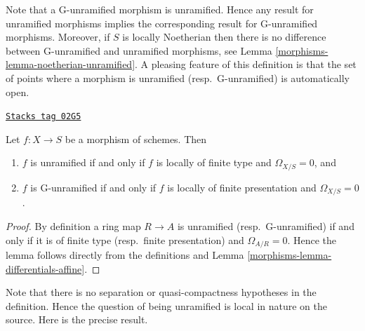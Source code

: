 Note that a G-unramified morphism is unramified. Hence any result for
unramified morphisms implies the corresponding result for G-unramified
morphisms. Moreover, if $S$ is locally Noetherian then there is no difference
between G-unramified and unramified morphisms, see
Lemma \ref{morphisms-lemma-noetherian-unramified}.
A pleasing feature of this definition is that the set of points
where a morphism is unramified (resp.\ G-unramified) is automatically open.

\begin{lemma}
\label{morphisms-lemma-unramified-omega-zero}
\href{https://stacks.math.columbia.edu/tag/02G5}{\texttt{Stacks tag 02G5}}

Let $f : X \to S$ be a morphism of schemes. Then
\begin{enumerate}
\item $f$ is unramified if and only if $f$ is locally of finite type
and $\Omega_{X/S} = 0$, and
\item $f$ is G-unramified if and only if $f$ is locally of finite presentation
and $\Omega_{X/S} = 0$.
\end{enumerate}
\end{lemma}

\begin{proof}

By definition a ring map $R \to A$ is unramified (resp.\ G-unramified)
if and only if it is of finite type (resp.\ finite presentation)
and $\Omega_{A/R} = 0$. Hence the lemma follows
directly from the definitions and Lemma \ref{morphisms-lemma-differentials-affine}.
\end{proof}

Note that there is no separation or quasi-compactness hypotheses in the
definition. Hence the question of being unramified is local in nature on
the source. Here is the precise result.

